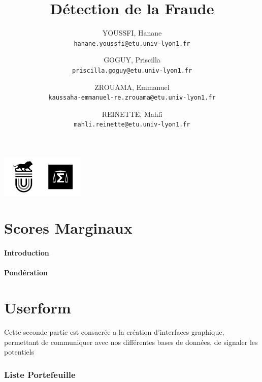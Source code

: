 \documentclass[10pt,a4paper]{article}
\title{Détection de la Fraude}
\author{YOUSSFI, Hanane\\ 
		\texttt{hanane.youssfi@etu.univ-lyon1.fr}
  		\and
  		GOGUY, Priscilla\\
  		\texttt{priscilla.goguy@etu.univ-lyon1.fr}
  		\and
  		ZROUAMA, Emmanuel\\
  		\texttt{kaussaha-emmanuel-re.zrouama@etu.univ-lyon1.fr}
  		\and
  		REINETTE, Mahlî\\
  		\texttt{mahli.reinette@etu.univ-lyon1.fr}}
\date{}
\begin{document}
\pagecolor{black!20}
\maketitle


\begin{center}
	\includegraphics[width=4cm,height=2cm]{img9}
\end{center}


\newpage
\tableofcontents

\part{Scores Marginaux}
\subsection{Introduction}

\subsection{Pondération}


\part{Userform}
\begin{center}
\begin{minipage}[r]{0.1\textwidth}

\end{minipage}
\begin{minipage}[r]{0.8\textwidth}

Cette seconde partie est consacrée a la création d'interfaces graphique, permettant de communiquer avec nos différentes bases de données, de signaler les potentiels 

\end{minipage}
\end{center}
\section{Liste Portefeuille}
\end{document}
